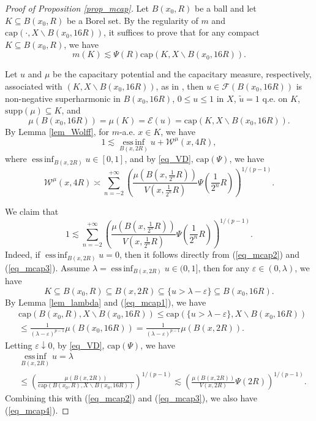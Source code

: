\documentclass[11pt,a4paper]{article}
\numberwithin{equation}{section}
\newcommand{\einf}{\operatorname*{ess\,inf}}
\theoremstyle{plain}
\theoremstyle{definition}
\begin{document}
\begin{proof}[Proof of Proposition \ref{prop_mcap}]
Let $B(x_0,R)$ be a ball and let $K\subseteq B(x_0,R)$ be a Borel set. By the regularity of $m$ and $\mathrm{cap}(\cdot,X\backslash B(x_0,16R))$, it suffices to prove that for any compact $K\subseteq B(x_0,R)$, we have
$$m(K)\lesssim \Psi(R)\mathrm{cap}(K,X\backslash B(x_0,16R)).$$

Let $u$ and $\mu$ be the capacitary potential and the capacitary measure, respectively, associated with $\left(K,X\backslash B(x_0,16R)\right)$, as in \cite[Lemma 3.8, Remark 3.9]{Yan25d}, then $u\in \mathcal{F}(B(x_0,16R))$ is non-negative superharmonic in $B(x_0,16R)$, $0\le u\le 1$ in $X$, $\widetilde{u}=1$ q.e. on $K$, $\mathrm{supp}(\mu)\subseteq K$, and
\begin{equation}\label{eq_mcap1}
\mu(B(x_0,16R))=\mu(K)=\mathcal{E}(u)=\mathrm{cap}(K,X\backslash B(x_0,16R)).
\end{equation}
By Lemma \ref{lem_Wolff}, for $m$-a.e. $x\in K$, we have
\begin{equation}\label{eq_mcap2}
1\lesssim \einf_{B(x,2R)}u+\mathcal{W}^\mu(x,4R),
\end{equation}
where $\einf_{B(x,2R)}u\in[0,1]$, and by \ref{eq_VD}, \hyperlink{eq_cap}{$\text{cap}(\Psi)$}, we have
\begin{equation}\label{eq_mcap3}
\mathcal{W}^\mu(x,4R)\asymp\sum_{n=-2}^{+\infty} \left(\frac{\mu(B(x,\frac{1}{2^n}R))}{V(x,\frac{1}{2^n}R)}\Psi(\frac{1}{2^n}R)\right)^{1/(p-1)}.
\end{equation}

We claim that
\begin{equation}\label{eq_mcap4}
1\lesssim \sum_{n=-2}^{+\infty} \left(\frac{\mu(B(x,\frac{1}{2^n}R))}{V(x,\frac{1}{2^n}R)}\Psi(\frac{1}{2^n}R)\right)^{1/(p-1)}.
\end{equation}
Indeed, if $\einf_{B(x,2R)}u=0$, then it follows directly from (\ref{eq_mcap2}) and (\ref{eq_mcap3}). Assume $\lambda=\einf_{B(x,2R)}u\in(0,1]$, then for any $\varepsilon\in(0,\lambda)$, we have
$$K\subseteq B(x_0,R)\subseteq B(x,2R)\subseteq \{u>\lambda-\varepsilon\}\subseteq B(x_0,16R).$$
By Lemma \ref{lem_lambda} and (\ref{eq_mcap1}), we have
\begin{align*}
&\mathrm{cap}\left(B(x_0,R),X\backslash B(x_0,16R)\right)\le\mathrm{cap}\left(\{u>\lambda-\varepsilon\},X\backslash B(x_0,16R)\right)\\
&\le \frac{1}{(\lambda-\varepsilon)^{p-1}}\mu(B(x_0,16R))=\frac{1}{(\lambda-\varepsilon)^{p-1}}\mu(B(x,2R)).
\end{align*}
Letting $\varepsilon\downarrow0$, by \ref{eq_VD}, \hyperlink{eq_cap}{$\text{cap}(\Psi)$}, we have
\begin{align*}
&\einf_{B(x,2R)}u=\lambda\\
&\le \left(\frac{\mu(B(x,2R))}{\mathrm{cap}\left(B(x_0,R),X\backslash B(x_0,16R)\right)}\right)^{1/(p-1)}\lesssim \left(\frac{\mu(B(x,2R))}{V(x,2R)}\Psi(2R)\right)^{1/(p-1)}.
\end{align*}
Combining this with (\ref{eq_mcap2}) and (\ref{eq_mcap3}), we also have (\ref{eq_mcap4}).


\end{proof}
\end{document}
